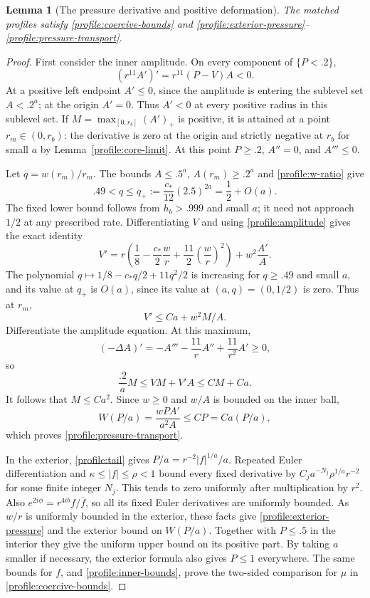\documentclass[11pt]{article}
\numberwithin{equation}{section}
\newtheorem{lemma}[theorem]{Lemma}
\theoremstyle{definition}
\theoremstyle{remark}
\begin{document}
\begin{lemma}[The pressure derivative and positive deformation]
\label{profile:pressure}
The matched profiles satisfy \eqref{profile:coercive-bounds} and
\eqref{profile:exterior-pressure}--\eqref{profile:pressure-transport}.
\end{lemma}

\begin{proof}
First consider the inner amplitude.  On every component of $\{P<.2\}$,
\[
 (r^{11}A')'=r^{11}(P-V)A<0.
\]
At a positive left endpoint $A'\le0$, since the amplitude is entering
the sublevel set $A<.2^a$; at the origin $A'=0$.  Thus $A'<0$ at every
positive radius in this sublevel set.  If
$M=\max_{[0,r_b]}(A')_+$ is positive, it is attained at a point
$r_m\in(0,r_b)$: the derivative is zero at the origin and strictly
negative at $r_b$ for small $a$ by Lemma~\ref{profile:core-limit}.
At this point $P\ge.2$, $A''=0$, and $A'''\le0$.

Let $q=w(r_m)/r_m$.  The bounds $A\le.5^a$, $A(r_m)\ge.2^a$ and
\eqref{profile:w-ratio} give
\[
 .49<q\le q_+:=\frac{c_*}{12}(2.5)^{2a}=\frac12+O(a).
\]
The fixed lower bound follows from $h_b>.999$ and small $a$; it need
not approach $1/2$ at any prescribed rate.  Differentiating $V$ and
using \eqref{profile:amplitude} gives the exact identity
\[
 V'=r\left(\frac18-\frac{c_*}{2}\frac wr
                  +\frac{11}{2}\left(\frac wr\right)^2\right)
          +w^2\frac{A'}A.
\]
The polynomial $q\mapsto1/8-c_*q/2+11q^2/2$ is increasing for
$q\ge.49$ and small $a$, and its value at $q_+$ is $O(a)$, since its
value at $(a,q)=(0,1/2)$ is zero.  Thus at $r_m$,
\[
 V'\le Ca+w^2M/A.
\]
Differentiate the amplitude equation.  At this maximum,
\[
 (-\Delta A)'=-A'''-\frac{11}{r}A''+\frac{11}{r^2}A'\ge0,
\]
so
\[
 \frac{.2}{a}M\le VM+V'A\le CM+Ca.
\]
It follows that $M\le Ca^2$.  Since $w\ge0$ and $w/A$ is bounded on
the inner ball,
\[
 W(P/a)=\frac{wPA'}{a^2A}\le CP=Ca(P/a),
\]
which proves \eqref{profile:pressure-transport}.

In the exterior, \eqref{profile:tail} gives
$P/a=r^{-2}|f|^{1/a}/a$.  Repeated Euler differentiation and
$\kappa\le|f|\le\rho<1$ bound every fixed derivative by
$C_j a^{-N_j}\rho^{1/a}r^{-2}$ for some finite integer $N_j$.
This tends to zero uniformly after multiplication by $r^2$.
Also
$e^{2i\phi}=r^{4ib}f/\overline f$, so all its fixed Euler derivatives
are uniformly bounded.  As $w/r$ is uniformly bounded in the exterior,
these facts give \eqref{profile:exterior-pressure} and the exterior
bound on $W(P/a)$.  Together with $P\le.5$ in the interior they give
the uniform upper bound on its positive part.  By taking $a$ smaller
if necessary, the exterior formula also gives $P\le1$ everywhere.
The same bounds for $f$, and \eqref{profile:inner-bounds}, prove the
two-sided comparison for $\mu$ in \eqref{profile:coercive-bounds}.


\end{proof}
\end{document}
